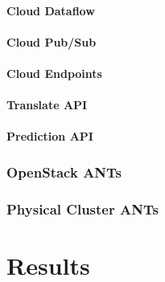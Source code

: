 \documentclass{acm_proc_article-sp}
\begin{document}
\paragraph{Cloud Dataflow}
\paragraph{Cloud Pub/Sub}
\paragraph{Cloud Endpoints}
\paragraph{Translate API}
\paragraph{Prediction API}
\subsubsection{OpenStack ANTs}
\subsubsection{Physical Cluster ANTs}
\pagebreak
\section{Results}
\pagebreak


\end{document}
